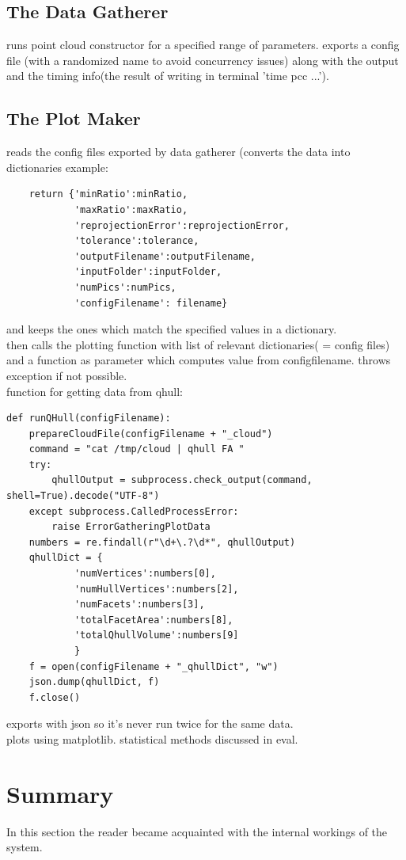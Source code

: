 \documentclass[12pt,a4paper,twoside,openright]{report}
\begin{document}
\subsection{The Data Gatherer}
runs point cloud constructor for a specified range of parameters. 
exports a config file (with a randomized name to avoid concurrency issues) along with the output and the timing info(the result of writing in terminal 'time pcc ...').
\subsection{The Plot Maker}
reads the config files exported by data gatherer (converts the data into dictionaries example: \begin{verbatim}
    return {'minRatio':minRatio,
            'maxRatio':maxRatio,
            'reprojectionError':reprojectionError,
            'tolerance':tolerance,
            'outputFilename':outputFilename,
            'inputFolder':inputFolder,
            'numPics':numPics,
            'configFilename': filename}
\end{verbatim} and keeps the ones which match the specified values in a dictionary.\\
then calls the plotting function with list of relevant dictionaries( = config files) and a function as parameter which computes value from configfilename. throws exception if not possible.\\
function for getting data from qhull: \begin{verbatim}
def runQHull(configFilename):
    prepareCloudFile(configFilename + "_cloud")
    command = "cat /tmp/cloud | qhull FA "
    try:
        qhullOutput = subprocess.check_output(command, shell=True).decode("UTF-8")
    except subprocess.CalledProcessError:
        raise ErrorGatheringPlotData
    numbers = re.findall(r"\d+\.?\d*", qhullOutput)
    qhullDict = {
            'numVertices':numbers[0],
            'numHullVertices':numbers[2],
            'numFacets':numbers[3],
            'totalFacetArea':numbers[8],
            'totalQhullVolume':numbers[9]
            }
    f = open(configFilename + "_qhullDict", "w")
    json.dump(qhullDict, f)
    f.close()

\end{verbatim} exports with json so it's never run twice for the same data.\\
plots using matplotlib. statistical methods discussed in eval.
\section{Summary} 
In this section the reader became  acquainted with the internal workings of the system.
\end{document}
